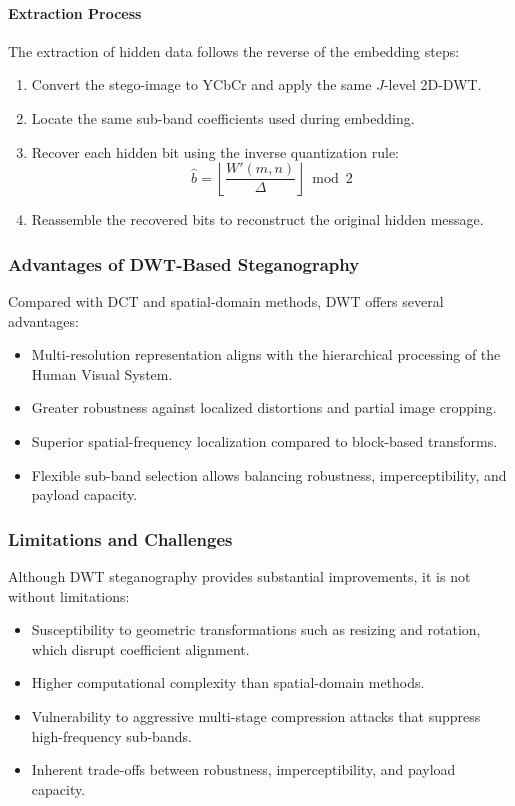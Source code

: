 \documentclass[12pt,a4paper,oneside]{report}
\begin{document}
	\paragraph{Extraction Process}
	The extraction of hidden data follows the reverse of the embedding steps:
	\begin{enumerate}
		\item Convert the stego-image to YCbCr and apply the same $J$-level 2D-DWT.
		\item Locate the same sub-band coefficients used during embedding.
		\item Recover each hidden bit using the inverse quantization rule:
		\begin{equation}
			\hat{b} = \left\lfloor \frac{W'(m,n)}{\Delta} \right\rfloor \bmod 2
		\end{equation}
		\item Reassemble the recovered bits to reconstruct the original hidden message.
	\end{enumerate}
	
	\subsubsection{Advantages of DWT-Based Steganography}
	Compared with DCT and spatial-domain methods, DWT offers several advantages:
	\begin{itemize}
		\item Multi-resolution representation aligns with the hierarchical processing of the Human Visual System.
		\item Greater robustness against localized distortions and partial image cropping.
		\item Superior spatial-frequency localization compared to block-based transforms.
		\item Flexible sub-band selection allows balancing robustness, imperceptibility, and payload capacity.
	\end{itemize}
	
	\subsubsection{Limitations and Challenges}
	Although DWT steganography provides substantial improvements, it is not without limitations:
	\begin{itemize}
		\item Susceptibility to geometric transformations such as resizing and rotation, which disrupt coefficient alignment.
		\item Higher computational complexity than spatial-domain methods.
		\item Vulnerability to aggressive multi-stage compression attacks that suppress high-frequency sub-bands.
		\item Inherent trade-offs between robustness, imperceptibility, and payload capacity.
	\end{itemize}
	
\end{document}
